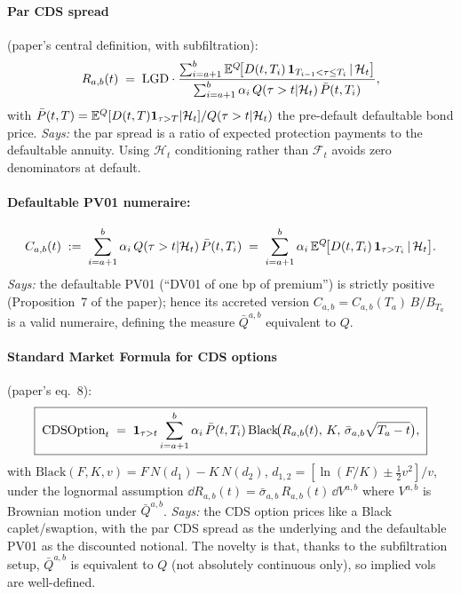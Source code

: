 \documentclass[11pt,a4paper]{article}
\begin{document}
\paragraph{Par CDS spread} (paper's central definition, with
subfiltration):
\begin{equation}\label{eq:cdsmm-par}
  R_{a,b}(t) \;=\; \mathrm{LGD} \cdot
                \frac{\sum_{i=a+1}^{b} \mathbb{E}^Q\!\bigl[D(t, T_i)\,\mathbf{1}_{T_{i-1} < \tau \le T_i}\,|\,\mathcal{H}_t\bigr]}
                     {\sum_{i=a+1}^{b} \alpha_i\, Q(\tau > t | \mathcal{H}_t)\, \bar P(t, T_i)},
\end{equation}
with $\bar P(t, T) = \mathbb{E}^Q[D(t,T)\mathbf{1}_{\tau > T}|\mathcal{H}_t]/Q(\tau > t|\mathcal{H}_t)$
the pre-default defaultable bond price.
\textit{Says:} the par spread is a ratio of expected protection
payments to the defaultable annuity. Using $\mathcal{H}_t$
conditioning rather than $\mathcal{F}_t$ avoids zero denominators at
default.

\paragraph{Defaultable PV01 numeraire:}
\begin{equation}\label{eq:cdsmm-pv01}
  C_{a,b}(t) \;:=\; \sum_{i=a+1}^{b} \alpha_i\, Q(\tau > t | \mathcal{H}_t)\, \bar P(t, T_i)
            \;=\; \sum_{i=a+1}^{b} \alpha_i\, \mathbb{E}^Q\!\bigl[D(t, T_i)\,\mathbf{1}_{\tau > T_i}\,|\,\mathcal{H}_t\bigr].
\end{equation}
\textit{Says:} the defaultable PV01 (``DV01 of one bp of premium'')
is strictly positive (Proposition~7 of the paper); hence its
accreted version $C_{a,b} = C_{a,b}(T_a)\, B/B_{T_a}$ is a valid
numeraire, defining the measure $\bar Q^{a,b}$ equivalent to $Q$.

\paragraph{Standard Market Formula for CDS options} (paper's eq.~8):
\begin{equation}\label{eq:cdsmm-black}
\boxed{\;
  \text{CDSOption}_t \;=\; \mathbf{1}_{\tau > t} \sum_{i=a+1}^{b}
          \alpha_i\, \bar P(t, T_i)\,
          \text{Black}\!\bigl(R_{a,b}(t),\, K,\, \bar\sigma_{a,b}\sqrt{T_a - t}\bigr),\;
}
\end{equation}
with $\text{Black}(F, K, v) = F\, N(d_1) - K\, N(d_2)$,
$d_{1,2} = [\ln(F/K) \pm \tfrac12 v^2]/v$, under the lognormal
assumption $\dd R_{a,b}(t) = \bar\sigma_{a,b}\, R_{a,b}(t)\, \dd V^{a,b}$
where $V^{a,b}$ is Brownian motion under $\bar Q^{a,b}$.
\textit{Says:} the CDS option prices like a Black caplet/swaption,
with the par CDS spread as the underlying and the defaultable PV01
as the discounted notional. The novelty is that, thanks to the
subfiltration setup, $\bar Q^{a,b}$ is equivalent to $Q$ (not
absolutely continuous only), so implied vols are well-defined.
\end{document}

